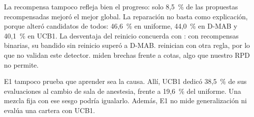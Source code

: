 La recompensa tampoco refleja bien el progreso: solo 8,5~\% de las propuestas
recompensadas mejoró el mejor global.
La reparación no basta como explicación, porque alteró candidatos de todos: 46,6~\%
en uniforme, 44,0~\% en D-MAB y 40,1~\% en UCB1.
La desventaja del reinicio concuerda con \textcite{dacosta2008}: con recompensas binarias, su bandido sin
reinicio superó a D-MAB. \textcite{dolatkhah2026} reinician con otra regla, por lo que
no validan este detector. \textcite{yin2026} miden brechas frente a cotas, algo que
nuestro RPD no permite.

E1 tampoco prueba que aprender sea la causa. Allí, UCB1 dedicó 38,5~\% de sus
evaluaciones al cambio de sala de anestesia, frente a 19,6~\% del uniforme.
Una mezcla fija con ese sesgo podría igualarlo. Además, E1 no mide generalización ni
evalúa una cartera con UCB1.%
\label{res-fin}
